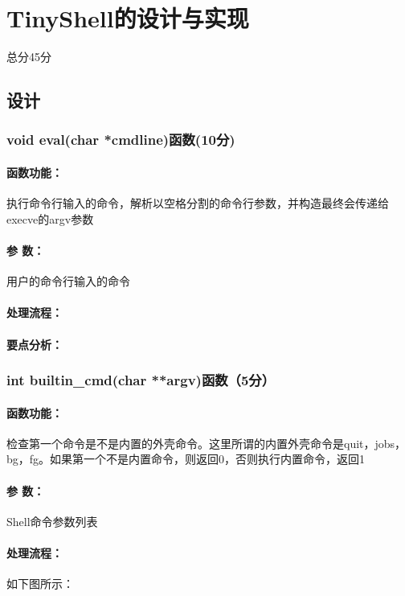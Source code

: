 \section{TinyShell的设计与实现}
\begin{center}
    总分45分
\end{center}

\subsection{设计}

\subsubsection{void eval(char *cmdline)函数(10分)}

\paragraph{函数功能：}执行命令行输入的命令，解析以空格分割的命令行参数，并构造最终会传递给execve的argv参数
\paragraph{参   数：}用户的命令行输入的命令
\paragraph{处理流程：}
\paragraph{要点分析：}

\subsubsection{int builtin\_cmd(char **argv)函数（5分）}

\paragraph{函数功能：}检查第一个命令是不是内置的外壳命令。这里所谓的内置外壳命令是quit，jobs，bg，fg。如果第一个不是内置命令，则返回0，否则执行内置命令，返回1
\paragraph{参   数：}Shell命令参数列表
\paragraph{处理流程：}如下图所示：
